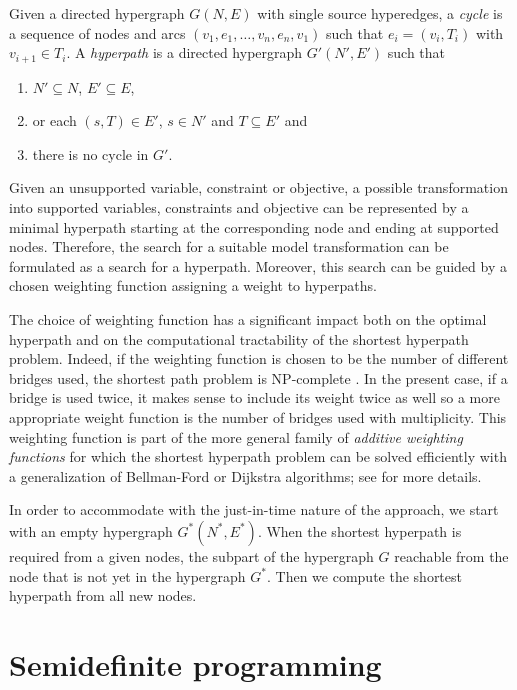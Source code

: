 \documentclass[11pt,twoside,a4paper,openright]{uclouvain-thesis}
\begin{document}
Given a directed hypergraph $G(N, E)$ with single source hyperedges, a \emph{cycle} is a sequence of nodes and arcs $(v_1, e_1, \ldots, v_n, e_n, v_1)$ such that $e_i = (v_i, T_i)$ with $v_{i+1} \in T_i$.
A \emph{hyperpath} is a directed hypergraph $G'(N', E')$ such that
\begin{enumerate}
  \item $N' \subseteq N$, $E' \subseteq E$,
  \item or each $(s, T) \in E'$, $s \in N'$ and $T \subseteq E'$ and
  \item there is no cycle in $G'$.
\end{enumerate}

Given an unsupported variable, constraint or objective, a possible transformation into supported variables, constraints and objective can be represented by a minimal hyperpath starting at the corresponding node and ending at supported nodes.
Therefore, the search for a suitable model transformation can be formulated as a search for a hyperpath.
Moreover, this search can be guided by a chosen weighting function assigning a weight to hyperpaths.

The choice of weighting function has a significant impact both on the optimal hyperpath and on the computational tractability of the shortest hyperpath problem.
Indeed, if the weighting function is chosen to be the number of different bridges used, the shortest path problem is NP-complete \cite{italiano1989online}.
In the present case, if a bridge is used twice, it makes sense to include its weight twice as well so a more appropriate weight function is the number of bridges used with multiplicity.
This weighting function is part of the more general family of \emph{additive weighting functions} for which the shortest hyperpath problem can be solved efficiently with a generalization of Bellman-Ford or Dijkstra algorithms; see \cite[Section~6]{gallo1993directed} for more details.

In order to accommodate with the just-in-time nature of the approach,
we start with an empty hypergraph $G^*(N^*, E^*)$.
When the shortest hyperpath is required from a given nodes, the subpart of the hypergraph $G$ reachable from the node that is not yet in the hypergraph $G^*$.
Then we compute the shortest hyperpath from all new nodes.



\section{Semidefinite programming}
\label{sec:sdp}
\end{document}
